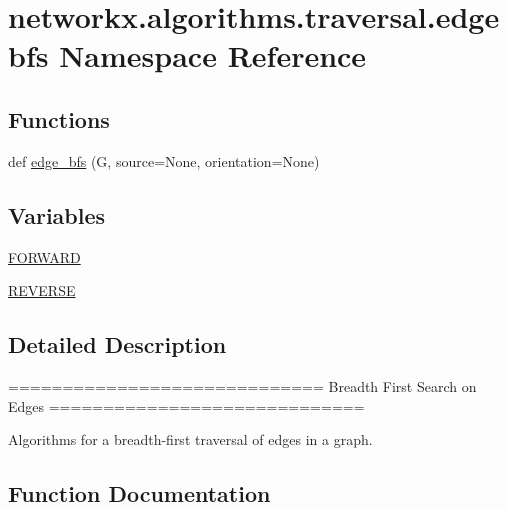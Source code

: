 \hypertarget{namespacenetworkx_1_1algorithms_1_1traversal_1_1edgebfs}{}\section{networkx.\+algorithms.\+traversal.\+edgebfs Namespace Reference}
\label{namespacenetworkx_1_1algorithms_1_1traversal_1_1edgebfs}
\subsection*{Functions}
\begin{DoxyCompactItemize}
\item 
def \hyperlink{namespacenetworkx_1_1algorithms_1_1traversal_1_1edgebfs_ac83786f13ee5dd5d5b1a60f71923a161}{edge\+\_\+bfs} (G, source=None, orientation=None)
\end{DoxyCompactItemize}
\subsection*{Variables}
\begin{DoxyCompactItemize}
\item 
\hyperlink{namespacenetworkx_1_1algorithms_1_1traversal_1_1edgebfs_a79cc754e55af9eaa2697c22a6e5812ca}{F\+O\+R\+W\+A\+RD}
\item 
\hyperlink{namespacenetworkx_1_1algorithms_1_1traversal_1_1edgebfs_afe7aee8e9f0e8937d05dadb883b84dcf}{R\+E\+V\+E\+R\+SE}
\end{DoxyCompactItemize}


\subsection{Detailed Description}
\begin{DoxyVerb}=============================
Breadth First Search on Edges
=============================

Algorithms for a breadth-first traversal of edges in a graph.\end{DoxyVerb}
 

\subsection{Function Documentation}
\mbox{\label{namespacenetworkx_1_1algorithms_1_1traversal_1_1edgebfs_ac83786f13ee5dd5d5b1a60f71923a161}} 
